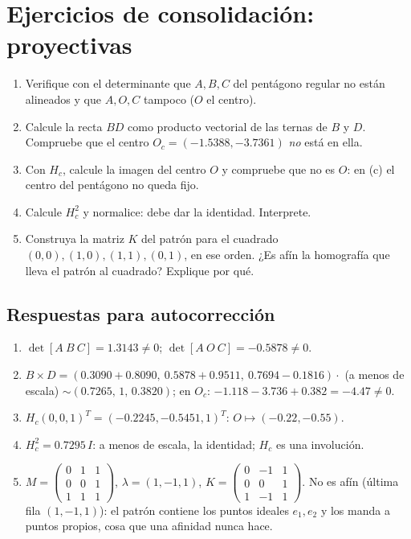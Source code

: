 \section{Ejercicios de consolidación: proyectivas}

\begin{enumerate}
  \item Verifique con el determinante que \(A,B,C\) del pentágono regular no están alineados
  y que \(A,O,C\) tampoco (\(O\) el centro).
  \item Calcule la recta \(BD\) como producto vectorial de las ternas de \(B\) y \(D\).
  Compruebe que el centro \(O_c=(-1.5388,-3.7361)\) \emph{no} está en ella.
  \item Con \(H_c\), calcule la imagen del centro \(O\) y compruebe que no es \(O\): en
  (c) el centro del pentágono no queda fijo.
  \item Calcule \(H_c^2\) y normalice: debe dar la identidad. Interprete.
  \item Construya la matriz \(K\) del patrón para el cuadrado \((0,0),(1,0),(1,1),(0,1)\),
  en ese orden. ¿Es afín la homografía que lleva el patrón al cuadrado? Explique por qué.
\end{enumerate}

\subsection{Respuestas para autocorrección}
\begin{enumerate}
  \item \(\det[A\ B\ C]=1.3143\neq0\); \(\det[A\ O\ C]=-0.5878\neq0\).
  \item \(B\times D=(0.3090+0.8090,\ 0.5878+0.9511,\ 0.7694-0.1816)\cdot\) (a menos de
  escala) \(\sim(0.7265,\,1,\,0.3820)\); en \(O_c\): \(-1.118-3.736+0.382=-4.47\neq0\).
  \item \(H_c(0,0,1)^T=(-0.2245,-0.5451,1)^T\): \(O\mapsto(-0.22,-0.55)\).
  \item \(H_c^2=0.7295\,I\): a menos de escala, la identidad; \(H_c\) es una involución.
  \item \(M=\begin{pmatrix}0&1&1\\0&0&1\\1&1&1\end{pmatrix}\), \(\lambda=(1,-1,1)\),
  \(K=\begin{pmatrix}0&-1&1\\0&0&1\\1&-1&1\end{pmatrix}\). No es afín (última fila
  \((1,-1,1)\)): el patrón contiene los puntos ideales \(e_1,e_2\) y los manda a puntos
  propios, cosa que una afinidad nunca hace.
\end{enumerate}

